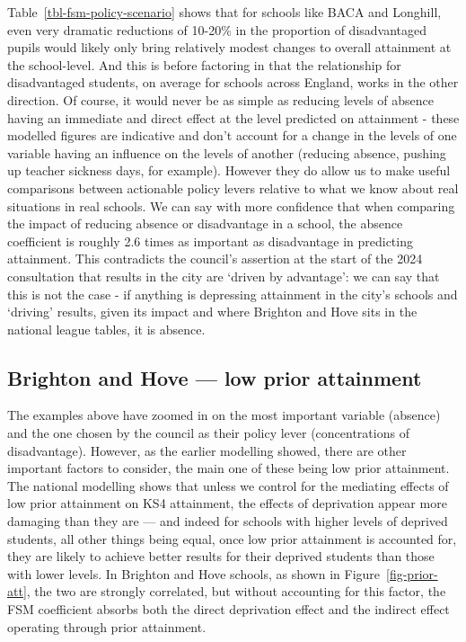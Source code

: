 \documentclass[
  11pt,
]{article}
\begin{document}
Table~\ref{tbl-fsm-policy-scenario} shows that for schools like BACA and
Longhill, even very dramatic reductions of 10-20\% in the proportion of
disadvantaged pupils would likely only bring relatively modest changes
to overall attainment at the school-level. And this is before factoring
in that the relationship for disadvantaged students, on average for
schools across England, works in the other direction. Of course, it
would never be as simple as reducing levels of absence having an
immediate and direct effect at the level predicted on attainment - these
modelled figures are indicative and don't account for a change in the
levels of one variable having an influence on the levels of another
(reducing absence, pushing up teacher sickness days, for example).
However they do allow us to make useful comparisons between actionable
policy levers relative to what we know about real situations in real
schools. We can say with more confidence that when comparing the impact
of reducing absence or disadvantage in a school, the absence coefficient
is roughly 2.6 times as important as disadvantage in predicting
attainment. This contradicts the council's assertion at the start of the
2024 consultation that results in the city are `driven by advantage': we
can say that this is not the case - if anything is depressing attainment
in the city's schools and `driving' results, given its impact and where
Brighton and Hove sits in the national league tables, it is absence.

\subsection{Brighton and Hove --- low prior
attainment}\label{brighton-and-hove-low-prior-attainment}

The examples above have zoomed in on the most important variable
(absence) and the one chosen by the council as their policy lever
(concentrations of disadvantage). However, as the earlier modelling
showed, there are other important factors to consider, the main one of
these being low prior attainment. The national modelling shows that
unless we control for the mediating effects of low prior attainment on
KS4 attainment, the effects of deprivation appear more damaging than
they are --- and indeed for schools with higher levels of deprived
students, all other things being equal, once low prior attainment is
accounted for, they are likely to achieve better results for their
deprived students than those with lower levels. In Brighton and Hove
schools, as shown in Figure~\ref{fig-prior-att}, the two are strongly
correlated, but without accounting for this factor, the FSM coefficient
absorbs both the direct deprivation effect and the indirect effect
operating through prior attainment.
\end{document}
